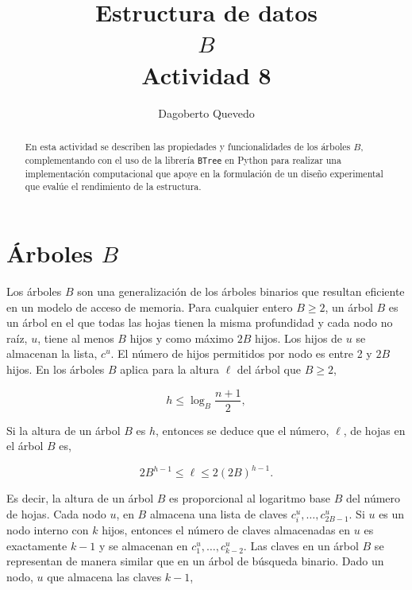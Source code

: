 \documentclass[letterpaper,11pt]{article}
\begin{document}
\title{Estructura de datos\\ $B$\\\small Actividad 8}
\author{Dagoberto Quevedo}
\maketitle

\begin{abstract}
En esta actividad se describen las propiedades y funcionalidades de los árboles $B$, complementando con el uso de la librería \texttt{BTree} en Python para realizar una implementación computacional que apoye en la formulación de un diseño experimental que evalúe el rendimiento de la estructura.
\end{abstract}

\section{Árboles $B$}

Los árboles $B$ son una generalización de los árboles binarios que resultan eficiente en un modelo de acceso de memoria. Para cualquier entero $B \ge 2$, un árbol $B$ es un árbol en el que todas las hojas tienen la misma profundidad y cada nodo no raíz, $u$, tiene al menos $B$ hijos y como máximo $2B$ hijos. Los hijos de $u$ se almacenan la lista, $c^u$. El número de hijos permitidos por nodo es entre 2 y $ 2B $ hijos. En los árboles $B$ aplica para la altura $\ell$ del árbol que  $B \ge 2$,

\begin{equation}
	h\le \log_{B} \frac{n+1}{2},
\end{equation}

Si la altura de un árbol $B$ es $h$, entonces se deduce que el número, $\ell$, de hojas en el árbol $B$ es,

\begin{equation}
	2B^{h-1}\le \ell \le 2(2B)^{h-1}.
\end{equation}

Es decir, la altura de un árbol $B$ es proporcional al logaritmo base $B$ del número de hojas. Cada nodo $u$, en $ B$  almacena una lista de claves $c^u_i,\dots,c^u_{2B-1}$. Si $u$ es un nodo interno con $k$ hijos, entonces el número de claves almacenadas en $u$ es exactamente $k-1$ y se almacenan en $c^u_1,\dots,c^u_{k-2}$. Las claves en un árbol $B$ se representan de manera similar que en un árbol de búsqueda binario. Dado un nodo, $u$ que almacena las claves $k-1$,
\end{document}
